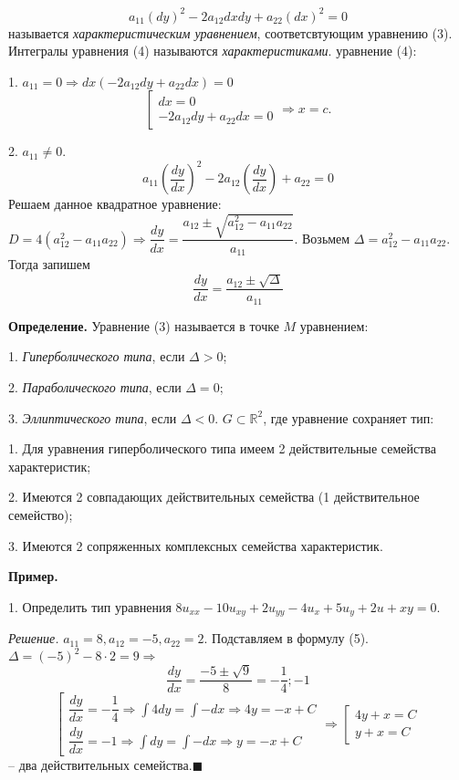 \documentclass[9pt]{article}
\begin{document}
\begin{equation}
    a_{11}(dy)^2-2a_{12}dxdy+a_{22}(dx)^2=0
\end{equation} называется \textit{характеристическим уравнением}, соответсвтующим уравнению (3). Интегралы уравнения (4) называются \textit{характеристиками}.
 уравнение (4):
\par1. \(a_{11}=0 \Rightarrow dx(-2a_{12}dy+a_{22}dx)=0\)
\[\left[
\begin{array}{l}
    dx=0\\
    -2a_{12}dy+a_{22}dx=0
\end{array}\right.\Rightarrow x=c.\]
\par2. \(a_{11}\neq0.\)
\[a_{11}\left(\dfrac{dy}{dx}\right)^2-2a_{12}\left(\dfrac{dy}{dx}\right)+a_22=0\]
Решаем данное квадратное уравнение: \(D=4(a_{12}^2-a_{11}a_{22}) \Rightarrow \dfrac{dy}{dx}=\dfrac{a_{12}\pm\sqrt{a_{12}^2-a_{11}a_{22}}}{a_{11}}\). Возьмем \(\Delta=a_{12}^2-a_{11}a_{22}\). Тогда запишем
\begin{equation}
    \dfrac{dy}{dx}=\dfrac{a_{12}\pm\sqrt{\Delta}}{a_{11}}
\end{equation}
\par\textbf{Определение.} Уравнение (3) называется в точке \(M\) уравнением: \par1. \textit{Гиперболического типа}, если \(\Delta>0\);
\par2. \textit{Параболического типа}, если \(\Delta=0\);
\par3. \textit{Эллиптического типа}, если \(\Delta<0\).
 \(G\subset\mathbb R^2\), где уравнение сохраняет тип:
\par1. Для уравнения гиперболического типа имеем 2 действительные семейства характеристик;
\par2. Имеются 2 совпадающих действительных семейства (1 действительное семейство);
\par3. Имеются 2 сопряженных комплексных семейства характеристик.
\par\textbf{Пример.}
\par1. Определить тип уравнения \(8u_{xx}-10u_{xy}+2u_{yy}-4u_x+5u_y+2u+xy=0\).
\par\textit{Решение.} \(a_{11}=8, a_{12}=-5, a_{22}=2\). Подставляем в формулу (5). \(\Delta =(-5)^2-8\cdot2=9 \Rightarrow\)\[\dfrac{dy}{dx}=\dfrac{-5\pm\sqrt{9}}{8}=-\dfrac{1}{4};-1\]
\[\left[
\begin{array}{l}
    \dfrac{dy}{dx}=-\dfrac{1}{4} \Rightarrow \int4dy=\int-dx \Rightarrow4y=-x+C\\
    \dfrac{dy}{dx}=-1 \Rightarrow \int dy=\int-dx \Rightarrow y=-x+C
\end{array}
\right.\Rightarrow\left[
\begin{array}{l}
    4y+x=C \\
    y+x=C
\end{array}\right.\] -- два действительных семейства.\(\blacksquare\)
\end{document}

